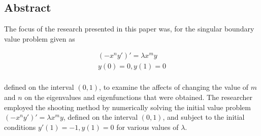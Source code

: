 \documentclass[executivepaper]{article}
\begin{document}
\vspace*{-40mm}

\renewcommand\thesubsection{\thesection.\arabic{subsection}}

\renewcommand{\ttdefault}{cmtt}

\newtheorem{observation}{Observation}

\begin{center}

\section*{Abstract}

The focus of the research presented in this paper was, for the singular boundary value problem given as 

\begin{center}

\vspace{-2mm}

\begin{equation}
\begin{array}{l}
\displaystyle (-x^ny')'=\lambda x^my\\[2ex]
\displaystyle y(0)=0, y(1)=0 \\
\end{array} 
\label{eq:BVP}
\end{equation}

\end{center}

defined on the interval $(0,1)$, to examine the affects of changing the value of $m$ and $n$ on the eigenvalues and eigenfunctions that were obtained. The researcher employed the shooting method by numerically solving the initial value problem $(-x^ny')'=\lambda x^my$, defined on the interval $(0,1)$, and subject to the initial conditions $y'(1)=-1, y(1)=0$ for various values of $\lambda$.

\end{center}
\end{document}
